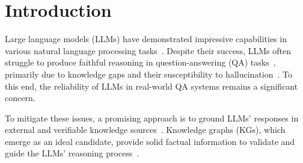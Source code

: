 \section{Introduction}


Large language models (LLMs) have demonstrated impressive capabilities
in various natural language processing tasks~\citep{Brown2020gpt3,team2023gemini,liu2024deepseek,dubey2024llama}.
Despite their success, LLMs often struggle to produce faithful reasoning in question-answering (QA) tasks~\citep{wang2023knowledge,radhakrishnan2023question}, primarily due to knowledge gaps and
their susceptibility to hallucination~\citep{ji2023survey,guan2024mitigating}. 
To this end, the reliability of LLMs in real-world QA systems remains a significant concern.

To mitigate these issues, a promising approach is to ground LLMs' responses in external and verifiable knowledge sources~\citep{lewis2020retrieval,li2023few,ren2025investigating}.
Knowledge graphs (KGs), which emerge as an ideal candidate, provide solid factual information to validate and guide the LLMs' reasoning process~\citep{luo2024rog,zhu2024llms}. 

